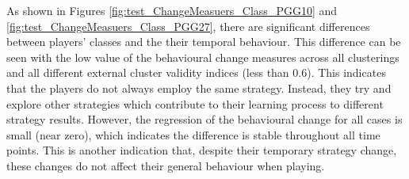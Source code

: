 As shown in Figures \ref{fig:test_ChangeMeasuers_Class_PGG10} and \ref{fig:test_ChangeMeasuers_Class_PGG27}, there are significant differences between players' classes and the their temporal behaviour. This difference can be seen with the low value of the behavioural change measures across all clusterings and all different external cluster validity indices (less than 0.6). This indicates that the players do not always employ the same strategy. Instead, they try and explore other strategies which contribute to their learning process to different strategy results. However, the regression of the behavioural change for all cases is small (near zero), which indicates the difference is stable throughout all time points. This is another indication that, despite their temporary strategy change, these changes do not affect their general behaviour when playing. 



